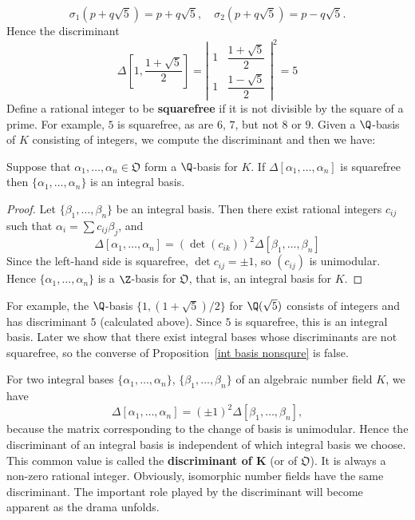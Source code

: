 \[\sigma_1(p+q\sqrt{5})=p+q\sqrt{5},\quad \sigma_2(p+q\sqrt{5})=p-q\sqrt{5}.\]
Hence the discriminant
\[\Delta[1,\frac{1+\sqrt{5}}{2}]=\left|\begin{array}{cc}
1&\dfrac{1+\sqrt{5}}{2}\\[8pt]
1&\dfrac{1-\sqrt{5}}{2}
\end{array}\right|^2=5\]
Define a rational integer to be \textbf{squarefree} if it is not divisible by the square of a prime. For example, $5$ is squarefree, as are $6$, $7$, but not $8$ or $9$. Given a $\Q$-basis of $K$ consisting of integers, we compute the discriminant and then we have:
\begin{proposition}\label{int basis nonsqure}
Suppose that $\alpha_1,\dots,\alpha_n\in\mathfrak{O}$ form a $\Q$-basis for $K$. If $\Delta[\alpha_1,\dots,\alpha_n]$ is squarefree then $\{\alpha_1,\dots,\alpha_n\}$ is an integral basis.
\end{proposition}
\begin{proof}
Let $\{\beta_1,\dots,\beta_n\}$ be an integral basis. Then there exist rational
integers $c_{ij}$ such that $\alpha_i=\sum c_{ij}\beta_j$, and
\[\Delta[\alpha_1,\dots,\alpha_n]=(\det(c_{ik}))^2\Delta[\beta_1,\dots,\beta_n]\]
Since the left-hand side is squarefree, $\det c_{ij}=\pm 1$, so $(c_{ij})$ is unimodular. Hence $\{\alpha_1,\dots,\alpha_n\}$ is a $\Z$-basis for $\mathfrak{O}$, that is, an integral basis for $K$.
\end{proof}
For example, the $\Q$-basis $\{1,(1+\sqrt{5})/2\}$ for $\Q(\sqrt{5})$ consists of integers and has discriminant $5$ (calculated above). Since $5$ is squarefree, this is an integral basis. Later we show that there exist integral bases whose discriminants are not squarefree, so the converse of Proposition~\ref{int basis nonsqure} is false.\par
For two integral bases $\{\alpha_1,\dots,\alpha_n\}$, $\{\beta_1,\dots,\beta_n\}$ of an algebraic number field $K$, we have
\[\Delta[\alpha_1,\dots,\alpha_n]=(\pm 1)^2\Delta[\beta_1,\dots,\beta_n],\]
because the matrix corresponding to the change of basis is unimodular. Hence the discriminant of an integral basis is independent of which integral basis we choose. This common value is called the \textbf{discriminant of $\bm{K}$} (or of $\mathfrak{O}$). It is always a non-zero rational integer. Obviously, isomorphic number fields have the same discriminant. The important role played by the discriminant will become apparent as the drama unfolds.
